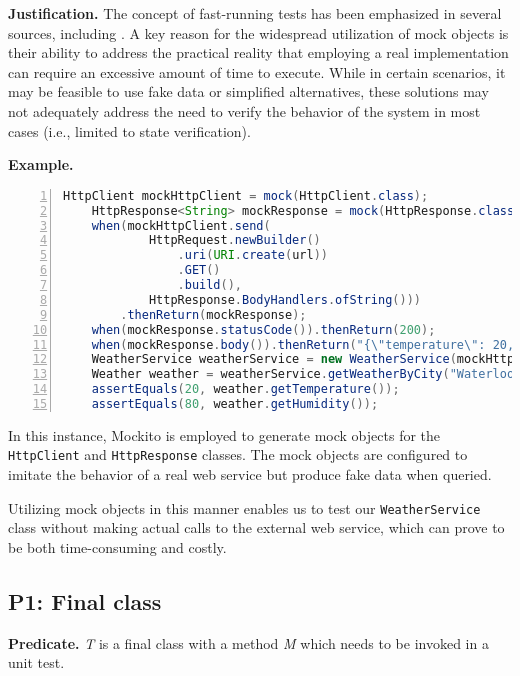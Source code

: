 \documentclass[conference]{IEEEtran}
\begin{document}
\textbf{Justification. }
The concept of fast-running tests has been emphasized in several sources, including \cite{cleancode}\cite{meszaros2007xunit}\cite{beck2003test}. A key reason for the widespread utilization of mock objects is their ability to address the practical reality that employing a real implementation can require an excessive amount of time to execute. While in certain scenarios, it may be feasible to use fake data or simplified alternatives, these solutions may not adequately address the need to verify the behavior of the system in most cases (i.e., limited to state verification). 

\textbf{Example. }
\begin{lstlisting}[basicstyle=\ttfamily,
numbers=left,numbersep=0pt,basicstyle=\scriptsize\ttfamily,language = Java, framesep=4.5mm, framexleftmargin=1.0mm, captionpos=b, escapechar=|, morekeywords={@Test}]
    HttpClient mockHttpClient = mock(HttpClient.class);
    HttpResponse<String> mockResponse = mock(HttpResponse.class);
    when(mockHttpClient.send(
            HttpRequest.newBuilder()
                .uri(URI.create(url))
                .GET()
                .build(),
            HttpResponse.BodyHandlers.ofString()))
        .thenReturn(mockResponse);
    when(mockResponse.statusCode()).thenReturn(200);
    when(mockResponse.body()).thenReturn("{\"temperature\": 20, \"humidity\": 80}");
    WeatherService weatherService = new WeatherService(mockHttpClient);
    Weather weather = weatherService.getWeatherByCity("Waterloo");
    assertEquals(20, weather.getTemperature());
    assertEquals(80, weather.getHumidity());
\end{lstlisting}

In this instance, Mockito \cite{mockito} is employed to generate mock objects for the \texttt{HttpClient} and \texttt{HttpResponse} classes. The mock objects are configured to imitate the behavior of a real web service but produce fake data when queried.

Utilizing mock objects in this manner enables us to test our \texttt{WeatherService} class without making actual calls to the external web service, which can prove to be both time-consuming and costly.

\subsection{P1: Final class}
\textbf{Predicate. }
\textit{T} is a final class with a method \textit{M} which needs to be invoked in a unit test.
\end{document}

